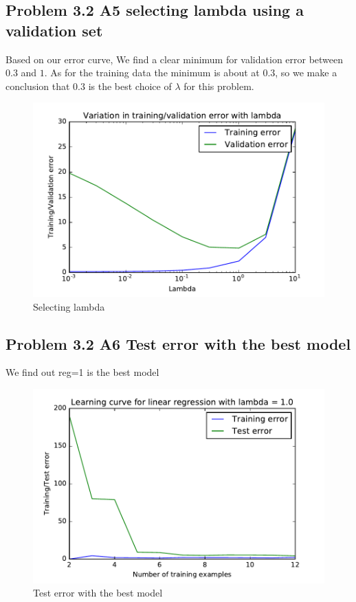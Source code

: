 \documentclass[pdftex,11pt]{article}
\begin{document}
\subsection{Problem 3.2 A5 selecting lambda using a validation set}
Based on our error curve, We find a clear minimum for validation error between $0.3$ and $1$. As for the training data the minimum is about at $0.3$, so we make a conclusion that $0.3$ is the best choice of $\lambda$ for this problem.

\begin{figure}
  \caption{Selecting lambda}
  \centering
    \includegraphics[scale=1]{fig12.pdf}
\end{figure}
\subsection{Problem 3.2 A6 Test error with the best model}
We find out reg=1 is the best model
\begin{figure}
  \caption{Test error with the best model}
  \centering
    \includegraphics[scale=1]{figtest.pdf}
\end{figure}
\end{document}
